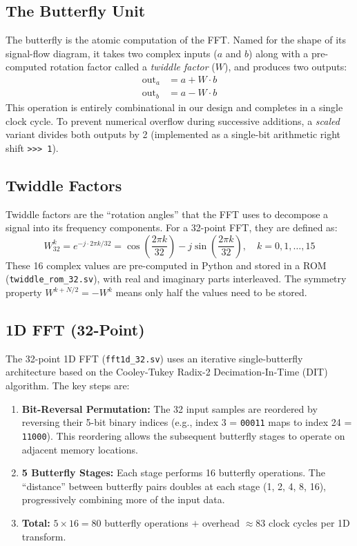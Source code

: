 \documentclass[a4paper,12pt]{report}
\begin{document}
\subsection{The Butterfly Unit}
The butterfly is the atomic computation of the FFT. Named for the shape of its signal-flow diagram, it takes two complex inputs ($a$ and $b$) along with a pre-computed rotation factor called a \textit{twiddle factor} ($W$), and produces two outputs:
\begin{align}
    \text{out}_a &= a + W \cdot b \\
    \text{out}_b &= a - W \cdot b
\end{align}
This operation is entirely combinational in our design and completes in a single clock cycle. To prevent numerical overflow during successive additions, a \textit{scaled} variant divides both outputs by 2 (implemented as a single-bit arithmetic right shift \texttt{>>>~1}).

\subsection{Twiddle Factors}
Twiddle factors are the ``rotation angles'' that the FFT uses to decompose a signal into its frequency components. For a 32-point FFT, they are defined as:
\begin{equation}
    W_{32}^k = e^{-j \cdot 2\pi k / 32} = \cos\!\left(\frac{2\pi k}{32}\right) - j\sin\!\left(\frac{2\pi k}{32}\right), \quad k = 0, 1, \ldots, 15
\end{equation}
These 16 complex values are pre-computed in Python and stored in a ROM (\texttt{twiddle\_rom\_32.sv}), with real and imaginary parts interleaved. The symmetry property $W^{k+N/2} = -W^k$ means only half the values need to be stored.

\subsection{1D FFT (32-Point)}
The 32-point 1D FFT (\texttt{fft1d\_32.sv}) uses an iterative single-butterfly architecture based on the Cooley-Tukey Radix-2 Decimation-In-Time (DIT) algorithm. The key steps are:
\begin{enumerate}
    \item \textbf{Bit-Reversal Permutation:} The 32 input samples are reordered by reversing their 5-bit binary indices (e.g., index 3 = \texttt{00011} maps to index 24 = \texttt{11000}). This reordering allows the subsequent butterfly stages to operate on adjacent memory locations.
    \item \textbf{5 Butterfly Stages:} Each stage performs 16 butterfly operations. The ``distance'' between butterfly pairs doubles at each stage (1, 2, 4, 8, 16), progressively combining more of the input data.
    \item \textbf{Total:} $5 \times 16 = 80$ butterfly operations $+$ overhead $\approx 83$ clock cycles per 1D transform.
\end{enumerate}
\end{document}
